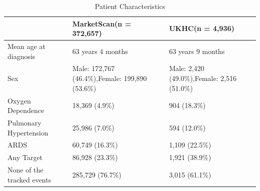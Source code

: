 \begin{table}[t]
\centering
\fontsize{9}{10}\selectfont
\caption{Patient Characteristics}
\label{table_PAT_CHAR}
\begin{tabular}{L{1.45in}|L{1.35in}|L{1.35in}}
\hline
 & \textbf{MarketScan}\newline\textbf{(n = 372,657)} & \textbf{UKHC}\newline\textbf{(n = 4,936)} \\ \hline
Mean age at diagnosis & 63 years 4 months & 63 years 9 months \\ \hline
Sex & Male: 172,767 (46.4\%),\newline Female: 199,890 (53.6\%) & Male: 2,420 (49.0\%),\newline Female: 2,516 (51.0\%) \\ \hline
Oxygen Dependence & 18,369 (4.9\%) & 904 (18.3\%) \\ \hline
Pulmonary Hypertension & 25,986 (7.0\%) & 594 (12.0\%) \\ \hline
ARDS & 60,749 (16.3\%) & 1,109 (22.5\%) \\ \hline
Any Target & 86,928 (23.3\%) & 1,921 (38.9\%) \\ \hline
None of the tracked events & 285,729 (76.7\%) & 3,015 (61.1\%) \\ \hline
\end{tabular}
\end{table}
